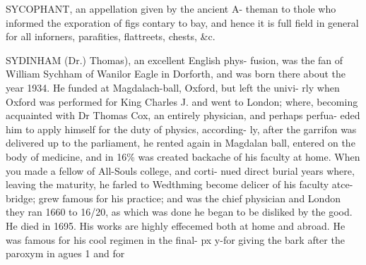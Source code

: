 SYCOPHANT, an appellation given by the ancient A-
theman to thole who informed the exporation of figs
contary to bay, and hence it is full field in general for all inforners, parafities, flattreets, chests, \&c.\par\medskip
SYDINHAM (Dr.) Thomas), an excellent English phys-
fusion, was the fan of William Sychham of Wanilor Eagle
in Dorforth, and was born there about the year 1934.
He funded at Magdalach-ball, Oxford, but left the univi-
rly when Oxford was performed for King Charles J. and
went to London; where, becoming acquainted with Dr
Thomas Cox, an entirely physician, and perhaps perfua-
eded him to apply himself for the duty of physics, according-
ly, after the garrifon was delivered up to the parliament,
he rented again in Magdalan ball, entered on the body of medicine, and in 16\% was created backache of his faculty at home.
When you made a fellow of All-Souls college, and corti-
nued direct burial years where, leaving the maturity, he
farled to Wedthming become delicer of his faculty atce-
bridge; grew famous for his practice; and was the chief
physician and London they ran 1660 to 16/20, as which
was done he began to be disliked by the good. He died in
1695. His works are highly effecemed both at home and
abroad. He was famous for his cool regimen in the final-
px y-for giving the bark after the paroxym in agues 1 and for\par\medskip

